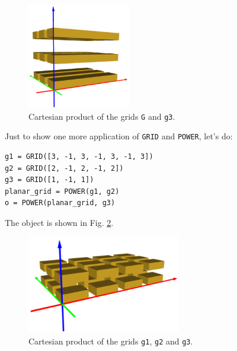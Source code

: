 \begin{figure}[!ht]
\begin{center}
\includegraphics[width=0.4\textwidth]{img/grid-112.png}
\end{center}
\vspace{-4mm}
\caption{Cartesian product of the grids {\tt G} and {\tt g3}.}
\label{fig:grid-112}
\end{figure}
\noindent
\noindent
Just to show one more application of {\tt GRID} and {\tt POWER},
let's do:\\

\begin{bbox}
\begin{verbatim}
g1 = GRID([3, -1, 3, -1, 3, -1, 3])
g2 = GRID([2, -1, 2, -1, 2])
g3 = GRID([1, -1, 1])
planar_grid = POWER(g1, g2)
o = POWER(planar_grid, g3)
\end{verbatim}
\end{bbox}
\vspace{6mm}

\noindent
The object is shown in Fig. \ref{fig:grid1}.\\[-10mm]

\begin{figure}[!ht]
\begin{center}
\includegraphics[width=0.6\textwidth]{img/grid-113.png}
\end{center}
\vspace{-4mm}
\caption{Cartesian product of the grids {\tt g1}, {\tt g2} and {\tt g3}.}
\label{fig:grid1}
\vspace{-1cm}
\end{figure}
\newpage
\noindent
 


